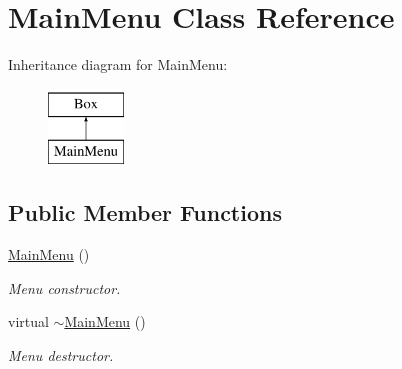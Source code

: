 \hypertarget{classMainMenu}{}\section{Main\+Menu Class Reference}
\label{classMainMenu}
Inheritance diagram for Main\+Menu\+:\begin{figure}[H]
\begin{center}
\leavevmode
\includegraphics[height=2.000000cm]{classMainMenu}
\end{center}
\end{figure}
\subsection*{Public Member Functions}
\begin{DoxyCompactItemize}
\item 
\mbox{\label{classMainMenu_a53eecf9d5ffd094f54ac4193e7e57eaf}} 
\mbox{\hyperlink{classMainMenu_a53eecf9d5ffd094f54ac4193e7e57eaf}{Main\+Menu}} ()
\begin{DoxyCompactList}\small\item\em Menu constructor. \end{DoxyCompactList}\item 
\mbox{\label{classMainMenu_a06d0ccbd60dd43322a79d762384344c8}} 
virtual \mbox{\hyperlink{classMainMenu_a06d0ccbd60dd43322a79d762384344c8}{$\sim$\+Main\+Menu}} ()
\begin{DoxyCompactList}\small\item\em Menu destructor. \end{DoxyCompactList}\end{DoxyCompactItemize}
